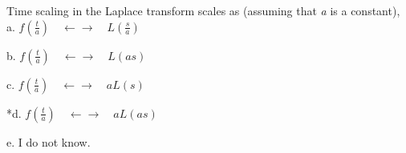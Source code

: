 
Time scaling in the Laplace transform scales as (assuming that \emph{a} is a constant), \\

a. $ f(\frac{t}{a}) \quad \leftarrow \rightarrow \quad L(\frac{s}{a}) $

b. $ f(\frac{t}{a}) \quad \leftarrow \rightarrow \quad L(as) $

c. $ f(\frac{t}{a}) \quad \leftarrow \rightarrow \quad aL(s) $

*d. $ f(\frac{t}{a}) \quad \leftarrow \rightarrow \quad aL(as) $

e. I do not know. \\
